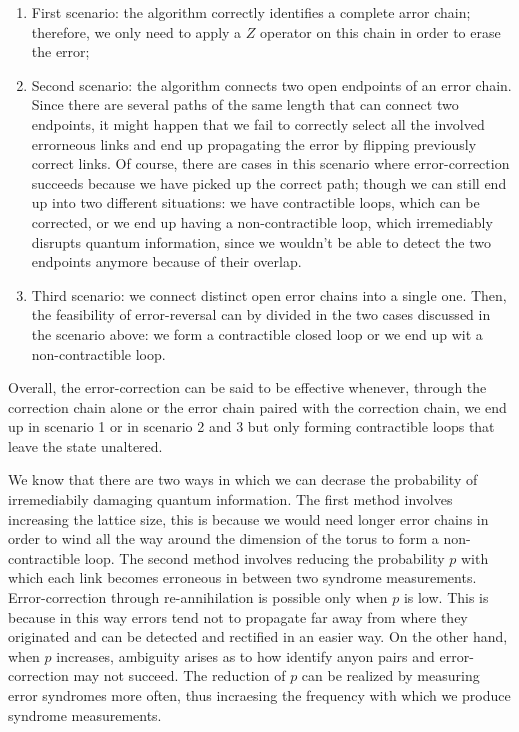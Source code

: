 \documentclass{Configuration_Files/PoliMi3i_thesis}
\begin{document}
\begin{enumerate}
	\item First scenario: the algorithm correctly identifies a complete arror chain; therefore, we only need to apply a $Z$ operator on this chain in order to erase the error;
	
	
	\item Second scenario: the algorithm connects two open endpoints of an error chain. Since there are several paths of the same length that can connect two endpoints, it might happen that we fail to correctly select all the involved errorneous links and end up propagating the error by flipping previously correct links. 
	Of course, there are cases in this scenario where error-correction succeeds because we have picked up the correct path; though we can still end up into two different situations: we have contractible loops, which can be corrected, or we end up having a non-contractible loop, which irremediably disrupts quantum information, since we wouldn't be able to detect the two endpoints anymore because of their overlap.
	
	
	\item Third scenario: we connect distinct open error chains into a single one. Then, the feasibility of error-reversal can by divided in the two cases discussed in the scenario above: we form a contractible closed loop or we end up wit a non-contractible loop. \newline
	
	
\end{enumerate}


Overall, the error-correction can be said to be effective whenever, through the correction chain alone or the error chain paired with the correction chain, we end up in scenario 1 or in scenario 2 and 3 but only forming contractible loops that leave the state unaltered. \newline

We know that there are two ways in which we can decrase the probability of irremediabily damaging quantum information. The first method involves increasing the lattice size, this is because we would need longer error chains in order to wind all the way around the dimension of the torus to form a non-contractible loop. The second method involves reducing the probability $p$ with which each link becomes erroneous in between two syndrome measurements. 
Error-correction through re-annihilation is possible only when $p$ is low. 
This is because in this way errors tend not to propagate far away from where they originated and can be detected and rectified in an easier way. On the other hand, when $p$ increases, ambiguity arises as to how identify anyon pairs and error-correction may not succeed. The reduction of $p$ can be realized by measuring error syndromes more often, thus incraesing the frequency with which we produce syndrome measurements.
\newline
\end{document}
